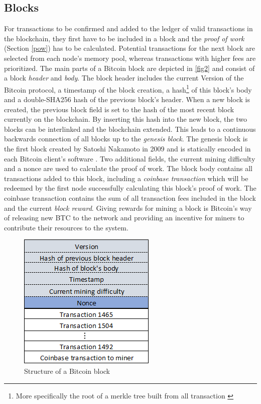 \documentclass[a4paper,12pt,twoside]{report}
\begin{document}
\subsection{Blocks}
For transactions to be confirmed and added to the ledger of valid transactions in the blockchain, they first have to be included in a block and the \textit{proof of work} (Section \ref{pow}) has to be calculated. Potential transactions for the next block are selected from each node's memory pool, whereas transactions with higher fees are prioritized. The main parts of a Bitcoin block are depicted in \autoref{fig2} and consist of a block \textit{header} and \textit{body}. The block header includes the current Version of the Bitcoin protocol, a timestamp of the block creation, a hash\footnote{More specifically the root of a merkle tree built from all transaction \cite{okupski2014bitcoin}} of this block's body and a double-SHA256 hash of the previous block's header. When a new block is created, the previous block field is set to the hash of the most recent block currently on the blockchain. By inserting this hash into the new block, the two blocks can be interlinked and the blockchain extended. This leads to a continuous backwards connection of all blocks up to the \textit{genesis block}. The genesis block is the first block created by Satoshi Nakamoto in 2009 and is statically encoded in each Bitcoin client's software \cite{antonopoulos2017mastering}. Two additional fields, the current mining difficulty and a nonce are used to calculate the proof of work. The block body contains all transactions added to this block, including a \textit{coinbase transaction} which will be redeemed by the first node successfully calculating this block's proof of work. The coinbase transaction contains the sum of all transaction fees included in the block and the current \textit{block reward}. Giving rewards for mining a block is Bitcoin's way of releasing new BTC to the network and providing an incentive for miners to contribute their resources to the system. \cite{okupski2014bitcoin,antonopoulos2017mastering}
\begin{figure}[ht]
	\centering
  \includegraphics[scale=0.7]{BlockExample.png}
	\caption{Structure of a Bitcoin block \cite{DSAwithTime,okupski2014bitcoin}}
	\label{fig2}
\end{figure}
\end{document}
